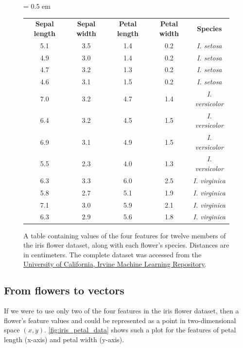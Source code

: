 \begin{figure}[h]
\centering
\tabcolsep = 0.5 em
\mySfFamily
{}
\begin{tabular}{c c c c c}
\rowcolor{gray!50}
\textbf{Sepal length} & \textbf{Sepal width} & \textbf{Petal length} & \textbf{Petal width} & \textbf{Species} \\
5.1 & 3.5 & 1.4 & 0.2 & \textit{I. setosa} \\
4.9 & 3.0 & 1.4 & 0.2 & \textit{I. setosa} \\
4.7 & 3.2 & 1.3 & 0.2 & \textit{I. setosa} \\
4.6 & 3.1 & 1.5 & 0.2 & \textit{I. setosa} \\
7.0 & 3.2 & 4.7 & 1.4 & \textit{I. versicolor} \\
6.4 & 3.2 & 4.5 & 1.5 & \textit{I. versicolor} \\
6.9 & 3.1 & 4.9 & 1.5 & \textit{I. versicolor} \\
5.5 & 2.3 & 4.0 & 1.3 & \textit{I. versicolor} \\
6.3 & 3.3 & 6.0 & 2.5 & \textit{I. virginica} \\
5.8 & 2.7 & 5.1 & 1.9 & \textit{I. virginica} \\
7.1 & 3.0 & 5.9 & 2.1 & \textit{I. virginica} \\
6.3 & 2.9 & 5.6 & 1.8 & \textit{I. virginica} \\
\end{tabular}
\caption{A table containing values of the four features for twelve members of the iris flower dataset, along with each flower's species. Distances are in centimeters. The complete dataset was accessed from the \href{https://archive.ics.uci.edu/ml/datasets/iris}{University of California, Irvine Machine Learning Repository}.}
\label{fig:iris_feature_table}
\end{figure}

\begin{qbox}\end{qbox}

\FloatBarrier
{}
\subsection{From flowers to vectors}

If we were to use only two of the four features in the iris flower dataset, then a flower's feature values  and  could be represented as a point in two-dimensional space $(x, y)$. \autoref{fig:iris_petal_data} shows such a plot for the features of petal length (x-axis) and petal width (y-axis).


